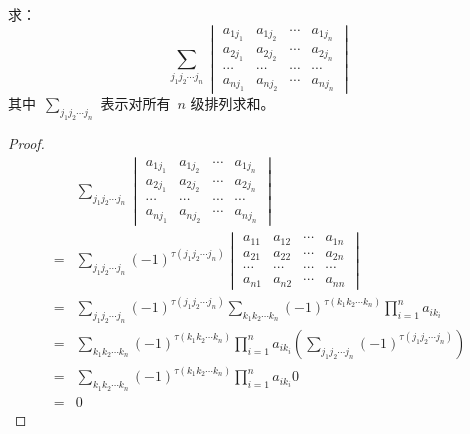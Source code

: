 \documentclass[twoside,openright]{book}
\begin{document}
\begin{CJK*}{UTF8}{}
\begin{quest}
\label{quest:67}
求：
\[
\sum_{j_1 j_2 \dotsm j_n}
\begin{vmatrix}
a_{1j_1} & a_{1j_2} & \dotsm & a_{1j_n} \\
a_{2j_1} & a_{2j_2} & \dotsm & a_{2j_n} \\
\dotsm   & \dotsm   & \dotsm & \dotsm   \\
a_{nj_1} & a_{nj_2} & \dotsm & a_{nj_n}
\end{vmatrix}
\]
其中\ $\sum_{j_1 j_2 \dotsm j_n}$ 表示对所有\ $n$ 级排列求和。
\end{quest}
\begin{proof}
\[
\begin{split}
&
\sum_{j_1 j_2 \dotsm j_n}
\begin{vmatrix}
a_{1j_1} & a_{1j_2} & \dotsm & a_{1j_n} \\
a_{2j_1} & a_{2j_2} & \dotsm & a_{2j_n} \\
\dotsm   & \dotsm   & \dotsm & \dotsm   \\
a_{nj_1} & a_{nj_2} & \dotsm & a_{nj_n}
\end{vmatrix}\\
=&
\sum_{j_1 j_2 \dotsm j_n}
(-1)^{\tau(j_1 j_2 \dotsm j_n)}
\begin{vmatrix}
a_{11} & a_{12} & \dotsm & a_{1n} \\
a_{21} & a_{22} & \dotsm & a_{2n} \\
\dotsm & \dotsm & \dotsm & \dotsm \\
a_{n1} & a_{n2} & \dotsm & a_{nn}
\end{vmatrix}\\
=&
\sum_{j_1 j_2 \dotsm j_n}
(-1)^{\tau(j_1 j_2 \dotsm j_n)}
\sum_{k_1 k_2 \dotsm k_n}
(-1)^{\tau(k_1 k_2 \dotsm k_n)}
\prod^n_{i=1}a_{ik_i}\\
=&
\sum_{k_1 k_2 \dotsm k_n}
(-1)^{\tau(k_1 k_2 \dotsm k_n)}
\prod^n_{i=1}a_{ik_i}
\left(
\sum_{j_1 j_2 \dotsm j_n}
(-1)^{\tau(j_1 j_2 \dotsm j_n)}
\right)\\
=&
\sum_{k_1 k_2 \dotsm k_n}
(-1)^{\tau(k_1 k_2 \dotsm k_n)}
\prod^n_{i=1}a_{ik_i}
0\\
=&0
\end{split}
\]
\end{proof}


\end{CJK*}
\end{document}

